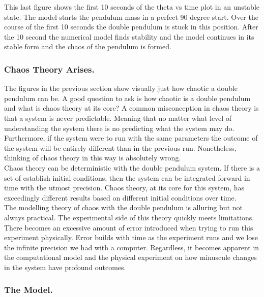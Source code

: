 \documentclass[runningheads]{llncs}
\begin{document}
This last figure shows the first 10 seconds of the theta vs time plot in an unstable state. The model starts the pendulum mass in a perfect 90 degree start. Over the course of the first 10 seconds the double pendulum is stuck in this position. After the 10 second the numerical model finds stability and the model continues in its stable form and the chaos of the pendulum is formed. 

\subsubsection{Chaos Theory Arises.}

The figures in the previous section show visually just how chaotic a double pendulum can be. A good question to ask is how chaotic is a double pendulum and what is chaos theory at its core? A common misconception in chaos theory is that a system is never predictable. Meaning that no matter what level of understanding the system there is no predicting what the system may do. Furthermore, if the system were to run with the same parameters the outcome of the system will be entirely different than in the previous run. Nonetheless, thinking of chaos theory in this way is absolutely wrong. \\

Chaos theory can be deterministic with the double pendulum system. If there is a set of establish initial conditions, then the system can be integrated forward in time with the utmost precision. Chaos theory, at its core for this system, has exceedingly different results based on different initial conditions over time. \\

The modelling theory of chaos with the double pendulum is alluring but not always practical. The experimental side of this theory quickly meets limitations. There becomes an excessive amount of error introduced when trying to run this experiment physically. Error builds with time as the experiment runs and we lose the infinite precision we had with a computer. Regardless, it becomes apparent in the computational model and the physical experiment on how minuscule changes in the system have profound outcomes. \\

\subsubsection{The Model.}
\end{document}
